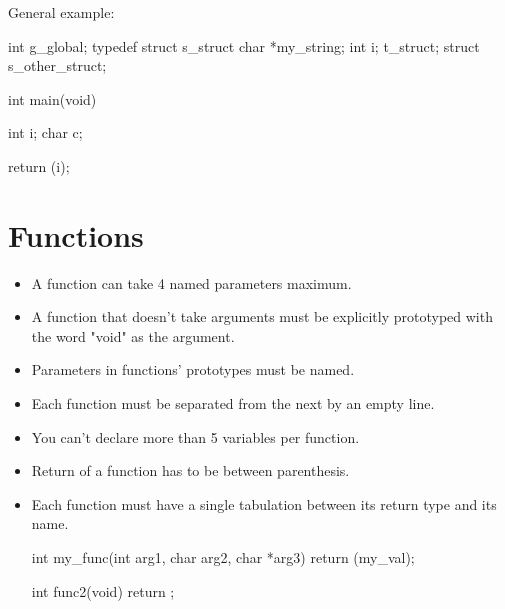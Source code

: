 \documentclass{42-en}
\begin{document}
            \newpage

            General example:
            \begin{42ccode}
int             g_global;
typedef struct  s_struct
{
    char    *my_string;
    int     i;
}               t_struct;
struct          s_other_struct;

int     main(void)
{
    int     i;
    char    c;

    return (i);
}
            \end{42ccode}
            \newpage

    \section{Functions}

        \begin{itemize}

            \item A function can take 4 named parameters maximum.

            \item A function that doesn't take arguments must be
                explicitly prototyped with the word "void" as the
                argument.

            \item Parameters in functions' prototypes must be named.

            \item Each function must be separated from the next by
                an empty line.

            \item You can't declare more than 5 variables per function.

            \item Return of a function has to be between parenthesis.

            \item Each function must have a single tabulation between its
                return type and its name.

            \begin{42ccode}
int my_func(int arg1, char arg2, char *arg3)
{
    return (my_val);
}

int func2(void)
{
    return ;
}
            \end{42ccode}

        \end{itemize}
        \newpage
\end{document}

